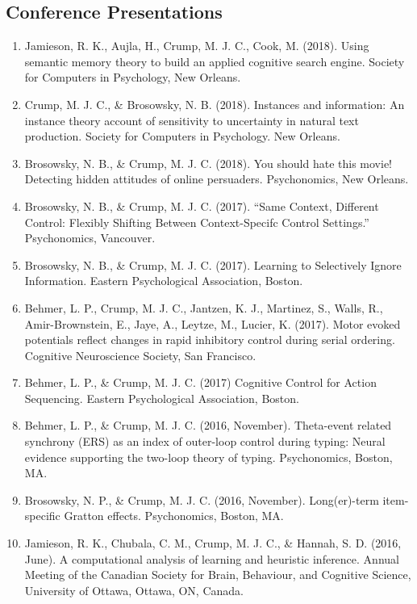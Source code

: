 \documentclass[11pt,a4paper,]{moderncv}
\providecommand{\tightlist}{%
	\setlength{\itemsep}{0pt}\setlength{\parskip}{0pt}}
\begin{document}
\hypertarget{conference-presentations}{%
\subsection{Conference Presentations}\label{conference-presentations}}

\begin{enumerate}
\def\labelenumi{\arabic{enumi}.}
\tightlist
\item
  Jamieson, R. K., Aujla, H., Crump, M. J. C., Cook, M. (2018). Using semantic memory theory to build an applied cognitive search engine. Society for Computers in Psychology, New Orleans.
\item
  Crump, M. J. C., \& Brosowsky, N. B. (2018). Instances and information: An instance theory account of sensitivity to uncertainty in natural text production. Society for Computers in Psychology. New Orleans.
\item
  Brosowsky, N. B., \& Crump, M. J. C. (2018). You should hate this movie! Detecting hidden attitudes of online persuaders. Psychonomics, New Orleans.
\item
  Brosowsky, N. B., \& Crump, M. J. C. (2017). ``Same Context, Different Control: Flexibly Shifting Between Context-Specifc Control Settings.'' Psychonomics, Vancouver.
\item
  Brosowsky, N. B., \& Crump, M. J. C. (2017). Learning to Selectively Ignore Information. Eastern Psychological Association, Boston.
\item
  Behmer, L. P., Crump, M. J. C., Jantzen, K. J., Martinez, S., Walls, R., Amir-Brownstein, E., Jaye, A., Leytze, M., Lucier, K. (2017). Motor evoked potentials reflect changes in rapid inhibitory control during serial ordering. Cognitive Neuroscience Society, San Francisco.
\item
  Behmer, L. P., \& Crump, M. J. C. (2017) Cognitive Control for Action Sequencing. Eastern Psychological Association, Boston.
\item
  Behmer, L. P., \& Crump, M. J. C. (2016, November). Theta-event related synchrony (ERS) as an index of outer-loop control during typing: Neural evidence supporting the two-loop theory of typing. Psychonomics, Boston, MA.
\item
  Brosowsky, N. P., \& Crump, M. J. C. (2016, November). Long(er)-term item-specific Gratton effects. Psychonomics, Boston, MA.
\item
  Jamieson, R. K., Chubala, C. M., Crump, M. J. C., \& Hannah, S. D. (2016, June). A computational analysis of learning and heuristic inference. Annual Meeting of the Canadian Society for Brain, Behaviour, and Cognitive Science, University of Ottawa, Ottawa, ON, Canada.

\end{enumerate}
\end{document}
